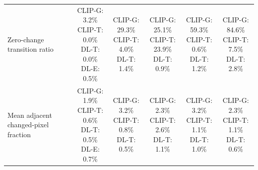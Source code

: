 \begin{table}[t]
{\begin{tabular}{lccccc}
\addlinespace[2pt]
Zero-change transition ratio & \shortstack[l]{\textsc{CLIP-G}: 3.2\% \\ \textsc{CLIP-T}: 0.0\% \\ \textsc{DL-T}: 0.0\% \\ \textsc{DL-E}: 0.5\%} & \shortstack[l]{\textsc{CLIP-G}: 29.3\% \\ \textsc{CLIP-T}: 4.0\% \\ \textsc{DL-T}: 1.4\%} & \shortstack[l]{\textsc{CLIP-G}: 25.1\% \\ \textsc{CLIP-T}: 23.9\% \\ \textsc{DL-T}: 0.9\%} & \shortstack[l]{\textsc{CLIP-G}: 59.3\% \\ \textsc{CLIP-T}: 0.6\% \\ \textsc{DL-T}: 1.2\%} & \shortstack[l]{\textsc{CLIP-G}: 84.6\% \\ \textsc{CLIP-T}: 7.5\% \\ \textsc{DL-T}: 2.8\%} \\
\addlinespace[2pt]
Mean adjacent changed-pixel fraction & \shortstack[l]{\textsc{CLIP-G}: 1.9\% \\ \textsc{CLIP-T}: 0.6\% \\ \textsc{DL-T}: 0.5\% \\ \textsc{DL-E}: 0.7\%} & \shortstack[l]{\textsc{CLIP-G}: 3.2\% \\ \textsc{CLIP-T}: 0.8\% \\ \textsc{DL-T}: 0.5\%} & \shortstack[l]{\textsc{CLIP-G}: 2.3\% \\ \textsc{CLIP-T}: 2.6\% \\ \textsc{DL-T}: 1.1\%} & \shortstack[l]{\textsc{CLIP-G}: 3.2\% \\ \textsc{CLIP-T}: 1.1\% \\ \textsc{DL-T}: 1.0\%} & \shortstack[l]{\textsc{CLIP-G}: 2.3\% \\ \textsc{CLIP-T}: 1.1\% \\ \textsc{DL-T}: 0.6\%} \\
\bottomrule
\end{tabular}%
}
\end{table}
